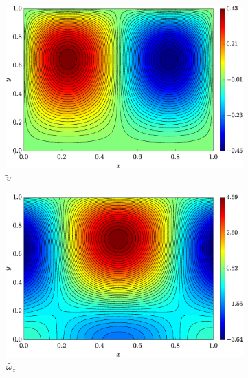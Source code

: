 \begin{figure}[H]
\begin{subfigure}[b]{.47\textwidth}
            \includegraphics[width=\textwidth]{figures/Case12/UCM/Solutions/Exact_Map_NormErr_2nd_Betann_0.1_Re_1_Wi_1_epsilon_0_xi_0_alphaG_0_Dt_1e-06_at_0.05_tipsim_1_MMS_12_V.eps}
            \caption{$\widetilde{v}$}
            \label{fig_solexavstreamlineCase1}
        \end{subfigure}
        \begin{subfigure}[b]{.47\textwidth}
            \includegraphics[width=\textwidth]{figures/Case12/UCM/Solutions/Exact_Map_NormErr_2nd_Betann_0.1_Re_1_Wi_1_epsilon_0_xi_0_alphaG_0_Dt_1e-06_at_0.05_tipsim_1_MMS_12_Wz.eps}
            \caption{$\widetilde{\omega_{z}}$}
            \label{fig_solexawzstreamlineCase1}
        \end{subfigure}
        \vspace{0.2cm}
        \begin{subfigure}[b]{.47\textwidth}

\end{subfigure}
\end{figure}
